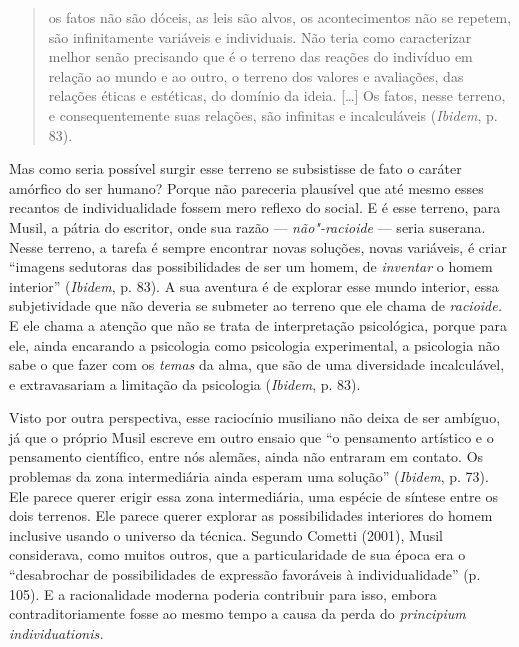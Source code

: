 \begin{quote}
os fatos não são dóceis, as leis são alvos, os acontecimentos não se
repetem, são infinitamente variáveis e individuais. Não teria como
caracterizar melhor senão precisando que é o terreno das reações do
indivíduo em relação ao mundo e ao outro, o terreno dos valores e
avaliações, das relações éticas e estéticas, do domínio da ideia.
[\ldots{}] Os fatos, nesse terreno, e consequentemente suas relações, são
infinitas e incalculáveis (\emph{Ibidem}, p. 83).
\end{quote}

Mas como seria possível surgir esse terreno se subsistisse de fato o
caráter amórfico do ser humano? Porque não pareceria plausível que até
mesmo esses recantos de individualidade fossem mero reflexo do social. E
é esse terreno, para Musil, a pátria do escritor, onde sua razão ---
\emph{não"-racioide} --- seria suserana. Nesse terreno, a tarefa é sempre
encontrar novas soluções, novas variáveis, é criar ``imagens sedutoras
das possibilidades de ser um homem, de \emph{inventar} o homem
interior'' (\emph{Ibidem}, p. 83). A sua aventura é de explorar esse
mundo interior, essa subjetividade que não deveria se submeter ao
terreno que ele chama de \emph{racioide.} E ele chama a atenção que não
se trata de interpretação psicológica, porque para ele, ainda encarando
a psicologia como psicologia experimental, a psicologia não sabe o que
fazer com os \emph{temas} da alma, que são de uma diversidade
incalculável, e extravasariam a limitação da psicologia (\emph{Ibidem},
p. 83).

Visto por outra perspectiva, esse raciocínio musiliano não deixa de ser
ambíguo, já que o próprio Musil escreve em outro ensaio que ``o
pensamento artístico e o pensamento científico, entre nós alemães, ainda
não entraram em contato. Os problemas da zona intermediária ainda
esperam uma solução'' (\emph{Ibidem}, p. 73). Ele parece querer erigir
essa zona intermediária, uma espécie de síntese entre os dois terrenos.
Ele parece querer explorar as possibilidades interiores do homem
inclusive usando o universo da técnica. Segundo Cometti (2001), Musil
considerava, como muitos outros, que a particularidade de sua época era
o ``desabrochar de possibilidades de expressão favoráveis à
individualidade'' (p. 105). E a racionalidade moderna poderia
contribuir para isso, embora contraditoriamente fosse ao mesmo tempo a
causa da perda do \emph{principium} \emph{individuationis.}

